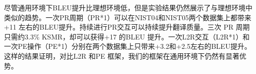 \documentclass[master, winfont]{njuthesis}
\begin{document}
尽管通用环境下BLEU提升比理想环境低，但是实验结果仍然展示了与理想环境中类似的趋势。一次PR周期（PR*1）可以在NIST04和NIST05两个数据集上都带来+11 左右的BLEU提升。持续进行PR交互可以持续提升翻译质量。三次 PR 周期只需约3.3\% KSMR，却可以获得+17 的BLEU 提升。一次L2R交互（L2R*1）和一次PE操作（PE*1）分别在两个数据集上只带来+3.2和+2.5左右的BLEU提升。这样的结果证明，对比L2R 和PE 框架，我们的框架在通用环境下仍然有显著优势。

%
%
%
%
\end{document}
